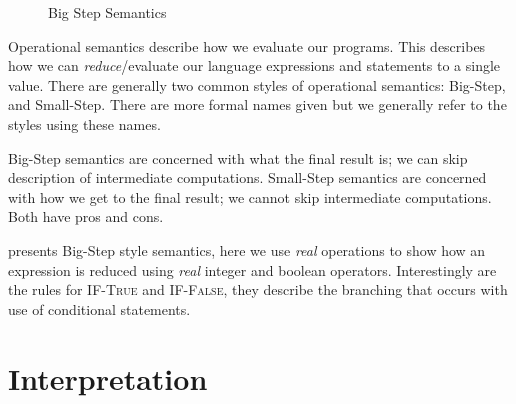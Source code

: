 \documentclass[10pt,a4paper,british,final]{article}
\begin{document}
\begin{figure}[ht]
  \caption{\label{fig:semantics}Big Step Semantics}
\end{figure}

Operational semantics describe how we evaluate our programs.
This describes how we can \emph{reduce}/evaluate our language expressions and statements to a single value.
There are generally two common styles of operational semantics: Big-Step, and Small-Step.
There are more formal names given but we generally refer to the styles using these names.

Big-Step semantics are concerned with what the final result is; we can skip description of intermediate computations.
Small-Step semantics are concerned with how we get to the final result; we cannot skip intermediate computations.
Both have pros and cons.

 presents Big-Step style semantics, here we use \emph{real} operations to show how an expression is reduced using \emph{real} integer and boolean operators.
Interestingly are the rules for \textsc{IF-True} and \textsc{IF-False}, they describe the branching that occurs with use of conditional statements.

\section{Interpretation}\label{sec:interpretation}
\end{document}
